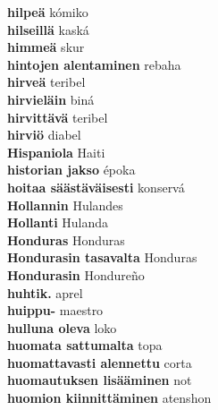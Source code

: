 \textbf{ hilpeä  } kómiko \\
\textbf{ hilseillä  } kaská \\
\textbf{ himmeä  } skur \\
\textbf{ hintojen alentaminen  } rebaha \\
\textbf{ hirveä  } teribel \\
\textbf{ hirvieläin  } biná \\
\textbf{ hirvittävä  } teribel \\
\textbf{ hirviö  } diabel \\
\textbf{ Hispaniola  } Haiti \\
\textbf{ historian jakso  } époka \\
\textbf{ hoitaa säästäväisesti  } konservá \\
\textbf{ Hollannin  } Hulandes \\
\textbf{ Hollanti  } Hulanda \\
\textbf{ Honduras  } Honduras \\
\textbf{ Hondurasin tasavalta  } Honduras \\
\textbf{ Hondurasin  } Hondureño \\
\textbf{ huhtik.  } aprel \\
\textbf{ huippu-  } maestro \\
\textbf{ hulluna oleva  } loko \\
\textbf{ huomata sattumalta  } topa \\
\textbf{ huomattavasti alennettu  } corta \\
\textbf{ huomautuksen lisääminen  } not \\
\textbf{ huomion kiinnittäminen  } atenshon \\
